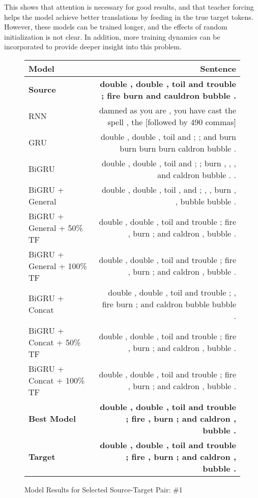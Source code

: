 \documentclass[twoside,twocolumn]{article}
\begin{document}
This shows that attention is necessary for good results, and that teacher
forcing helps the model achieve better translations by feeding in the true
target tokens. However, these models can be trained longer, and the effects
of random initialization is not clear. In addition, more training dynamics can
be incorporated to provide deeper insight into this problem.

\label{sec:results}

\begin{figure*}
    \centering
    \begin{tabular}{ |l|r| }
        \hline
        \textbf{Model}
          & \textbf{Sentence} \\
        \hline
        \textbf{Source} & \textbf{double , double , toil and trouble ; fire burn and cauldron bubble .} \\ \hline
        RNN & damned as you are , you have cast the spell , the [followed by 490 commas] \\ \hline
        GRU & double , double , toil and ; ; and burn burn burn burn caldron bubble . \\ \hline
        BiGRU & double , double , toil and ; ; burn , , , and caldron bubble . . \\ \hline
        BiGRU + General & double , double , toil , and ; , , burn , , bubble bubble . \\ \hline
        BiGRU + General + 50\% TF & double , double , toil and trouble ; fire , burn ; and caldron , bubble . \\ \hline
        BiGRU + General + 100\% TF & double , double , toil and trouble ; fire , burn ; and caldron , bubble . \\ \hline
        BiGRU + Concat & double , double , toil and trouble ; , fire burn ; and caldron bubble bubble . \\ \hline
        BiGRU + Concat + 50\% TF & double , double , toil and trouble ; fire , burn ; and caldron , bubble . \\ \hline
        BiGRU + Concat + 100\% TF & double , double , toil and trouble ; fire , burn ; and caldron , bubble . \\ \hline
        \textbf{Best Model} & \textbf{double , double , toil and trouble ; fire , burn ; and caldron , bubble .} \\ \hline
        \textbf{Target} & \textbf{double , double , toil and trouble ; fire , burn ; and caldron , bubble .} \\ \hline
    \end{tabular}

    \caption{Model Results for Selected Source-Target Pair: \#1}
    \label{fig:model-results}
\end{figure*}
\end{document}
